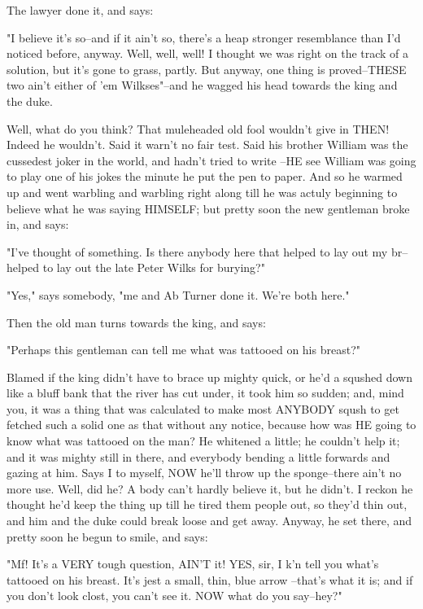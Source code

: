 The lawyer done it, and says:

"I believe it's so--and if it ain't so, there's a heap stronger
resemblance than I'd noticed before, anyway.  Well, well, well!  I
thought we was right on the track of a solution, but it's gone to grass,
partly.  But anyway, one thing is proved--THESE two ain't either of 'em
Wilkses"--and he wagged his head towards the king and the duke.

Well, what do you think?  That muleheaded old fool wouldn't give in THEN!
Indeed he wouldn't.  Said it warn't no fair test.  Said his brother
William was the cussedest joker in the world, and hadn't tried to write
--HE see William was going to play one of his jokes the minute he put the
pen to paper.  And so he warmed up and went warbling and warbling right
along till he was actuly beginning to believe what he was saying
HIMSELF; but pretty soon the new gentleman broke in, and says:

"I've thought of something.  Is there anybody here that helped to lay out
my br--helped to lay out the late Peter Wilks for burying?"

"Yes," says somebody, "me and Ab Turner done it.  We're both here."

Then the old man turns towards the king, and says:

"Perhaps this gentleman can tell me what was tattooed on his breast?"

Blamed if the king didn't have to brace up mighty quick, or he'd a
squshed down like a bluff bank that the river has cut under, it took him
so sudden; and, mind you, it was a thing that was calculated to make most
ANYBODY sqush to get fetched such a solid one as that without any notice,
because how was HE going to know what was tattooed on the man?  He
whitened a little; he couldn't help it; and it was mighty still in there,
and everybody bending a little forwards and gazing at him.  Says I to
myself, NOW he'll throw up the sponge--there ain't no more use.  Well,
did he?  A body can't hardly believe it, but he didn't.  I reckon he
thought he'd keep the thing up till he tired them people out, so they'd
thin out, and him and the duke could break loose and get away.  Anyway,
he set there, and pretty soon he begun to smile, and says:

"Mf!  It's a VERY tough question, AIN'T it!  YES, sir, I k'n tell you
what's tattooed on his breast.  It's jest a small, thin, blue arrow
--that's what it is; and if you don't look clost, you can't see it.  NOW
what do you say--hey?"

